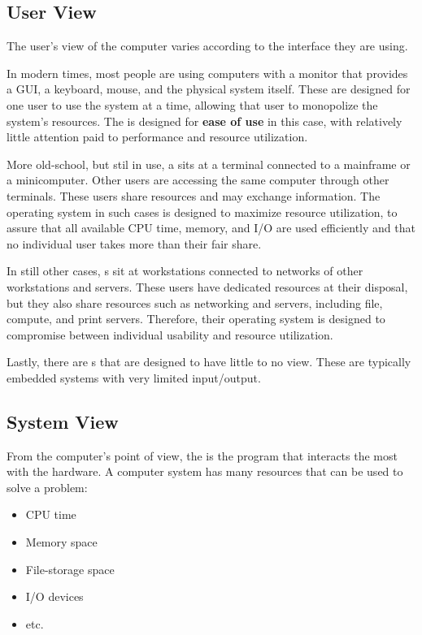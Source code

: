 \subsection{User View}\label{subsec:User_View}
The user's view of the computer varies according to the interface they are using.

In modern times, most people are using computers with a monitor that provides a GUI, a keyboard, mouse, and the physical system itself.
These are designed for one user to use the system at a time, allowing that user to monopolize the system's resources.
The  is designed for \textbf{ease of use} in this case, with relatively little attention paid to performance and resource utilization.

More old-school, but stil in use, a  sits at a terminal connected to a mainframe or a minicomputer.
Other users are accessing the same computer through other terminals.
These users share resources and may exchange information.
The operating system in such cases is designed to maximize resource utilization, to assure that all available CPU time, memory, and I/O are used efficiently and that no individual user takes more than their fair share.

In still other cases, s sit at workstations connected to networks of other workstations and servers.
These users have dedicated resources at their disposal, but they also share resources such as networking and servers, including file, compute, and print servers.
Therefore, their operating system is designed to compromise between individual usability and resource utilization.

Lastly, there are s that are designed to have little to no  view.
These are typically embedded systems with very limited input/output.

\subsection{System View}\label{subsec:System_View}
From the computer’s point of view, the  is the program that interacts the most with the hardware.
A computer system has many resources that can be used to solve a problem:
\begin{itemize}[noitemsep]
\item CPU time
\item Memory space
\item File-storage space
\item I/O devices
\item etc.
\end{itemize}

